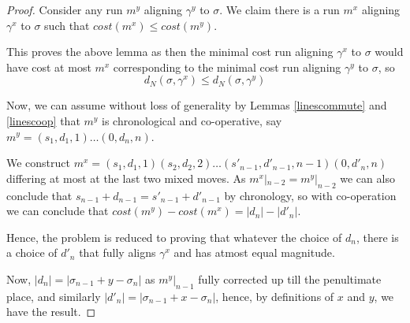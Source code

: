\documentclass[runningheads]{llncs}
\begin{document}
\begin{proof}
Consider any run $m^y$ aligning $\gamma^y$ to $\sigma$. 
We claim there is a run $m^x$ aligning $\gamma^x$ to $\sigma$ such that $cost(m^x) \leq cost(m^y)$. 

This proves the above lemma as then the minimal cost run aligning $\gamma^x$ to $\sigma$ would have cost at most $m^x$ corresponding to the minimal cost run aligning $\gamma^y$ to $\sigma$, so $$d_N(\sigma, \gamma^x) \leq d_N(\sigma, \gamma^y)$$

Now, we can assume without loss of generality by Lemmas \ref{linescommute} and \ref{linescoop}  that $m^y$ is chronological and co-operative, say $m^y = (s_1, d_1, 1) \dots (0, d_n, n)$. 

We construct $m^x = (s_1, d_1, 1)(s_2, d_2, 2)\dots (s'_{n-1}, d'_{n-1}, n-1)(0, d'_n, n)$ differing at most at the last two mixed moves. 
As $m^x|_{n-2} = m^y|_{n-2}$ we can also conclude that $s_{n-1} + d_{n-1} = s'_{n-1} + d'_{n-1}$ by chronology, so with co-operation we can conclude that $cost(m^y) - cost(m^x) = |d_n| - |d'_n|$. 

Hence, the problem is reduced to proving that whatever the choice of $d_n$, there is a choice of $d'_n$ that fully aligns $\gamma^x$ and has atmost equal magnitude. 

Now, $|d_n| = |\sigma_{n-1} + y - \sigma_n|$ as $m^y|_{n-1}$ fully corrected up till the penultimate place, and similarly $|d'_n| = |\sigma_{n-1} + x - \sigma_n|$, hence, by definitions of $x$ and $y$, we have the result. 

\end{proof}
\end{document}
